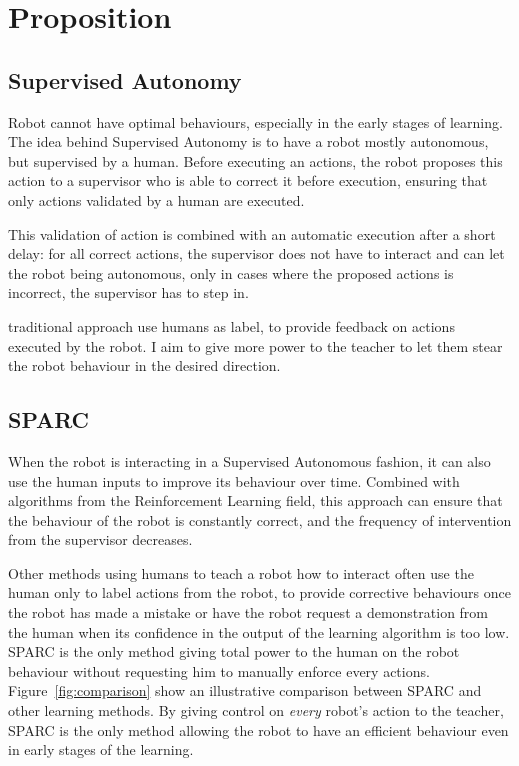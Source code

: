 \documentclass[conference]{IEEEtran}
\begin{document}
\section{Proposition}

\subsection{Supervised Autonomy}

Robot cannot have optimal behaviours, especially in the early stages of
learning. The idea behind Supervised Autonomy is to have a robot mostly
autonomous, but supervised by a human. Before executing an actions, the robot
proposes this action to a supervisor who is able to correct it before execution,
ensuring that only actions validated by a human are executed. 

This validation of action is combined with an automatic execution after a short
delay: for all correct actions, the supervisor does not have to interact and can
let the robot being autonomous, only in cases where the proposed actions is
incorrect, the supervisor has to step in.

traditional approach use humans as label, to provide feedback on actions
executed by the robot. I aim to give more power to the teacher to let them stear
the robot behaviour in the desired direction.


\subsection{SPARC}

When the robot is interacting in a Supervised Autonomous fashion, it can also
use the human inputs to improve its behaviour over time. Combined with
algorithms from the Reinforcement Learning field, this approach can ensure that
the behaviour of the robot is constantly correct, and the frequency of
intervention from the supervisor decreases.

Other methods using humans to teach a robot how to interact often use the human
only to label actions from the robot, to provide corrective behaviours once
the robot has made a mistake or have the robot request a demonstration from the
human when its confidence in the output of the learning algorithm is too low.
SPARC is the only method giving total power to the human on the robot behaviour
without requesting him to manually enforce every actions.
Figure~\ref{fig:comparison} show an illustrative comparison between SPARC and
other learning methods. By giving control on \emph{every} robot's action to the
teacher, SPARC is the only method allowing the robot to have an efficient
behaviour even in early stages of the learning.
\end{document}
